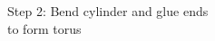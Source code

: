 \documentclass[preview]{standalone}
\begin{document}
\begin{center}
Step 2: Bend cylinder and glue ends\\to form torus
\end{center}
\end{document}
